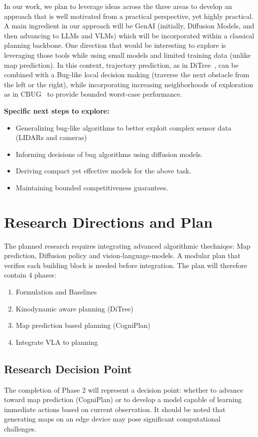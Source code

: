 \documentclass[12pt]{article}
\begin{document}
In our work, we plan to leverage ideas across the three areas to develop an approach that is well motivated from a practical perspective, yet highly practical. A main ingredient in our approach will be GenAI (initially, Diffusion Models, and then advancing to LLMs and VLMs) which will be incorporated within a classical planning backbone. One direction that would be interesting to explore is leveraging those tools while using small models and limited training data (unlike map prediction). In this context, trajectory prediction, as in DiTree~\cite{hassidof2025trainonce}, can be combined with a Bug-like local decision making (traverse the next obstacle from the left or the right), while incorporating  increasing neighborhoods of exploration as in CBUG~\cite{gabriely2005cbug} to provide bounded worst-case performance. 

\vspace{5pt} 
\noindent \textbf{Specific next steps to explore:}
\begin{itemize}
    \item Generalizing bug-like algorithms to better exploit complex sensor data (LIDARs and cameras)
    \item Informing decisions of bug algorithms using diffusion models.
    \item Deriving compact yet effective models for the above task.
    \item Maintaining bounded competitiveness guarantees.  
\end{itemize}

\section{Research Directions and Plan}

The planned research requires integrating advanced algorithmic thechniqes: Map prediction, Diffusion policy and vision-language-models. A modular plan that verifies each building block is needed before integration. The plan will therefore contain 4 phases:
\begin{enumerate}
    \item Formulation and Baselines
    \item Kinodynamic aware planning (DiTree)
    \item Map prediction based planning (CogniPlan)
    \item Integrate VLA to planning
\end{enumerate}

\subsection*{Research Decision Point}
The completion of Phase 2 will represent a decision point: whether to advance toward map prediction (CogniPlan) or to develop a model capable of learning immediate actions based on current observation. It should be noted that generating maps on an edge device may pose significant computational challenges.
\end{document}
